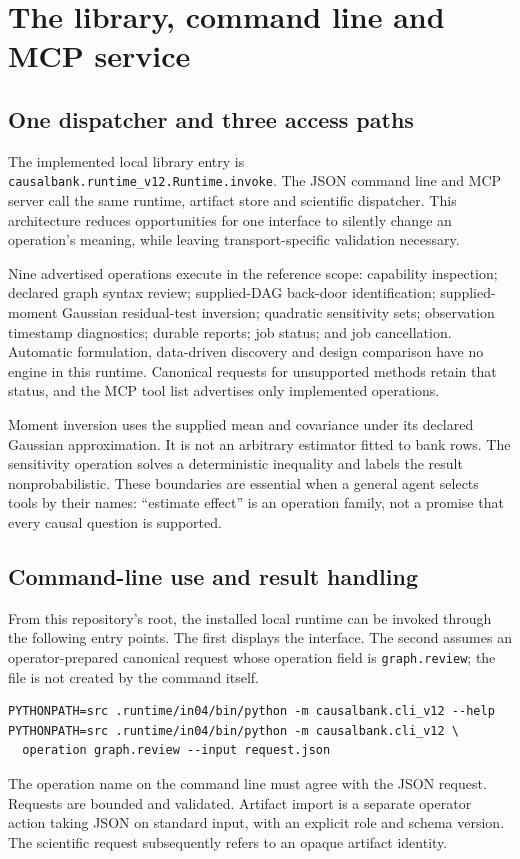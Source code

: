 \chapter{The library, command line and MCP service}
\label{in:surfaces}

\section{One dispatcher and three access paths}

The implemented local library entry is
\texttt{causalbank.runtime\_v12.Runtime.invoke}. The JSON command line and MCP
server call the same runtime, artifact store and scientific dispatcher. This
architecture reduces opportunities for one interface to silently change an
operation's meaning, while leaving transport-specific validation necessary.
\cite{v12_in_runtime}

Nine advertised operations execute in the reference scope: capability
inspection; declared graph syntax review; supplied-DAG back-door identification;
supplied-moment Gaussian residual-test inversion; quadratic sensitivity sets;
observation timestamp diagnostics; durable reports; job status; and job
cancellation. Automatic formulation, data-driven discovery and design comparison
have no engine in this runtime. Canonical requests for unsupported methods
retain that status, and the MCP tool list advertises only implemented operations.

Moment inversion uses the supplied mean and covariance under its declared
Gaussian approximation. It is not an arbitrary estimator fitted to bank rows.
The sensitivity operation solves a deterministic inequality and labels the
result nonprobabilistic. These boundaries are essential when a general agent
selects tools by their names: ``estimate effect'' is an operation family, not a
promise that every causal question is supported.

\section{Command-line use and result handling}

From this repository's root, the installed local runtime can be invoked through
the following entry points. The first displays the interface. The second
assumes an operator-prepared canonical request whose operation field is
\texttt{graph.review}; the file is not created by the command itself.
\begin{lstlisting}
PYTHONPATH=src .runtime/in04/bin/python -m causalbank.cli_v12 --help
PYTHONPATH=src .runtime/in04/bin/python -m causalbank.cli_v12 \
  operation graph.review --input request.json
\end{lstlisting}
The operation name on the command line must agree with the JSON request.
Requests are bounded and validated. Artifact import is a separate operator
action taking JSON on standard input, with an explicit role and schema version.
The scientific request subsequently refers to an opaque artifact identity.
\cite{v12_in_runtime}

